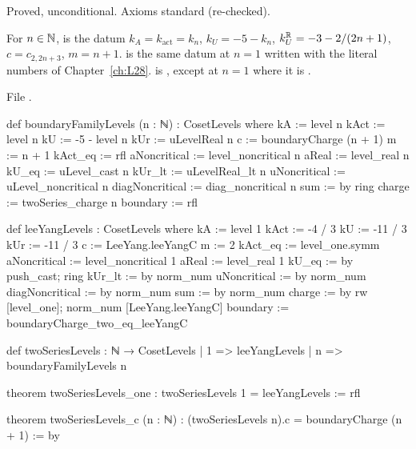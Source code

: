 \begin{status}
Proved, unconditional. Axioms standard (re-checked).
\end{status}

\begin{definition}\label{l29:def:twolevels}
For $n\in{\mathbb{N}}$,  is the datum $k_A=k_{\mathrm{act}}=k_n$, $k_U=-5-k_n$,
$k_U^{\mathbb{R}}=-3-2/(2n+1)$, $c=c_{2,2n+3}$, $m=n+1$.  is the same datum at $n=1$ written with the
literal numbers of Chapter~\ref{ch:L28}.  is , except at $n=1$
where it is .
\end{definition}

\noindent File .
\begin{leancode}
def boundaryFamilyLevels (n : ℕ) : CosetLevels where
  kA := level n
  kAct := level n
  kU := -5 - level n
  kUr := uLevelReal n
  c := boundaryCharge (n + 1)
  m := n + 1
  kAct_eq := rfl
  aNoncritical := level_noncritical n
  aReal := level_real n
  kU_eq := uLevel_cast n
  kUr_lt := uLevelReal_lt n
  uNoncritical := uLevel_noncritical n
  diagNoncritical := diag_noncritical n
  sum := by ring
  charge := twoSeries_charge n
  boundary := rfl

def leeYangLevels : CosetLevels where
  kA := level 1
  kAct := -4 / 3
  kU := -11 / 3
  kUr := -11 / 3
  c := LeeYang.leeYangC
  m := 2
  kAct_eq := level_one.symm
  aNoncritical := level_noncritical 1
  aReal := level_real 1
  kU_eq := by push_cast; ring
  kUr_lt := by norm_num
  uNoncritical := by norm_num
  diagNoncritical := by norm_num
  sum := by norm_num
  charge := by rw [level_one]; norm_num [LeeYang.leeYangC]
  boundary := boundaryCharge_two_eq_leeYangC

def twoSeriesLevels : ℕ → CosetLevels
  | 1 => leeYangLevels
  | n => boundaryFamilyLevels n

theorem twoSeriesLevels_one : twoSeriesLevels 1 = leeYangLevels := rfl

theorem twoSeriesLevels_c (n : ℕ) : (twoSeriesLevels n).c = boundaryCharge (n + 1) := by
\end{leancode}

